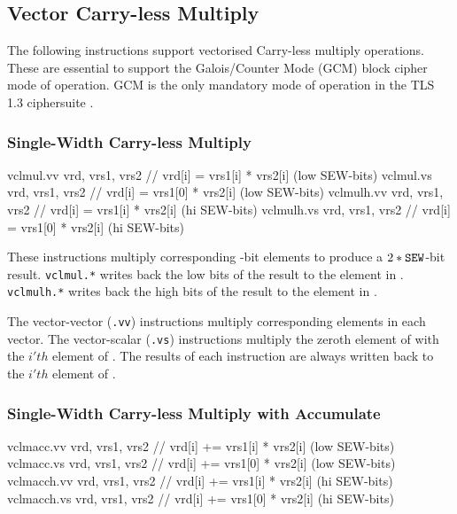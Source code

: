 
\subsection{Vector Carry-less Multiply}

The following instructions support vectorised Carry-less multiply
operations.
These are essential to support the Galois/Counter Mode (GCM) \cite{nist:gcm}
block cipher mode of operation.
GCM is the only mandatory mode of operation in the TLS 1.3
ciphersuite \cite[Section 9.1]{tls:1.3}.


\subsubsection{Single-Width Carry-less Multiply}
\label{sec:vector:clmul:hilo}

\begin{cryptoisa}
vclmul.vv   vrd, vrs1, vrs2 // vrd[i]  = vrs1[i] * vrs2[i] (low SEW-bits)
vclmul.vs   vrd, vrs1, vrs2 // vrd[i]  = vrs1[0] * vrs2[i] (low SEW-bits)
vclmulh.vv  vrd, vrs1, vrs2 // vrd[i]  = vrs1[i] * vrs2[i] (hi  SEW-bits)
vclmulh.vs  vrd, vrs1, vrs2 // vrd[i]  = vrs1[0] * vrs2[i] (hi  SEW-bits)
\end{cryptoisa}

These instructions multiply corresponding \SEW-bit elements
to produce a $2*{\tt SEW}$-bit result.
{\tt vclmul.*} writes back the low \SEW bits of the result to the
element in \vrd.
{\tt vclmulh.*} writes back the high \SEW bits of the result to the
element in \vrd.

The vector-vector ({\tt *.vv}) instructions multiply corresponding
elements in each vector.
The vector-scalar ({\tt *.vs}) instructions multiply the zeroth
element of  with the $i'th$ element of .
The results of each instruction are always written back to the $i'th$
element of \vrd.


\subsubsection{Single-Width Carry-less Multiply with Accumulate}
\label{sec:vector:clmul:accumulating}

\begin{cryptoisa}
vclmacc.vv  vrd, vrs1, vrs2 // vrd[i] += vrs1[i] * vrs2[i] (low SEW-bits)
vclmacc.vs  vrd, vrs1, vrs2 // vrd[i] += vrs1[0] * vrs2[i] (low SEW-bits)
vclmacch.vv vrd, vrs1, vrs2 // vrd[i] += vrs1[i] * vrs2[i] (hi  SEW-bits)
vclmacch.vs vrd, vrs1, vrs2 // vrd[i] += vrs1[0] * vrs2[i] (hi  SEW-bits)
\end{cryptoisa}

